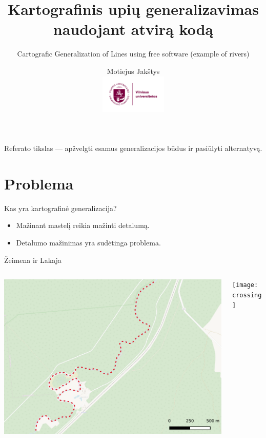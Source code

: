 \documentclass[14pt]{beamer}
\title{
    Kartografinis upių generalizavimas naudojant atvirą kodą
}
\subtitle{
    \vspace{2em}
    Cartografic Generalization of Lines using free software (example of rivers)
}
\author{Motiejus Jakštys \\
    \includegraphics[height=5em]{../../misc/Logo_vilniaus_universitetas}
}
\newcommand{\twocols}[2]
{
    \begin{columns}[c]
        \begin{column}{0.5\textwidth}
            #1
        \end{column}
        \hspace{0pt} \vrule{}
        \begin{column}{0.5\textwidth}
            #2
        \end{column}
    \end{columns}
}
\begin{document}

\begin{frame}
\titlepage
\end{frame}

\begin{frame}
    Referato tikslas --- apžvelgti esamus generalizacijos būdus ir pasiūlyti
      alternatyvą.
\end{frame}

\section{Problema}

\begin{frame}{Kas yra kartografinė generalizacija?}
    \begin{itemize}[<+->]
        \item Mažinant mastelį reikia mažinti detalumą.
        \item Detalumo mažinimas yra sudėtinga problema.
    \end{itemize}
\end{frame}

\begin{frame}{Žeimena ir Lakaja}
    \twocols
    {\includegraphics[width=\textwidth]{zeimena}}
    {\texttt{[image: crossing]}}
\end{frame}
\end{document}
